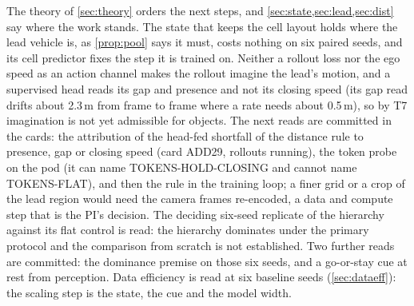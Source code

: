 \documentclass[10pt,twocolumn]{article}
\theoremstyle{remark}
\begin{document}
The theory of \cref{sec:theory} orders the next steps, and \cref{sec:state,sec:lead,sec:dist} say where the work stands. The state that keeps the cell layout holds where the lead vehicle is, as \cref{prop:pool} says it must, costs nothing on six paired seeds, and its cell predictor fixes the step it is trained on. Neither a rollout loss nor the ego speed as an action channel makes the rollout imagine the lead's motion, and a supervised head reads its gap and presence and not its closing speed (its gap read drifts about 2.3\,m from frame to frame where a rate needs about 0.5\,m), so by T7 imagination is not yet admissible for objects. The next reads are committed in the cards: the attribution of the head-fed shortfall of the distance rule to presence, gap or closing speed (card ADD29, rollouts running), the token probe on the pod (it can name TOKENS-HOLD-CLOSING and cannot name TOKENS-FLAT), and then the rule in the training loop; a finer grid or a crop of the lead region would need the camera frames re-encoded, a data and compute step that is the PI's decision. The deciding six-seed replicate of the hierarchy against its flat control is read: the hierarchy dominates under the primary
protocol and the comparison from scratch is not established. Two further reads are committed: the
dominance premise on those six seeds, and a go-or-stay cue at rest from perception. Data efficiency is read at six baseline seeds (\cref{sec:dataeff}): the scaling step is the state, the cue and the model width.

\end{document}
